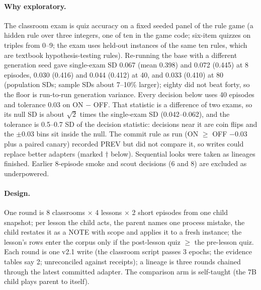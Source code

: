 \documentclass{article}
\begin{document}
\paragraph{Why exploratory.} The classroom exam is quiz accuracy on a fixed seeded panel of the rule game (a hidden rule over three integers, one of ten in the game code; six-item quizzes on triples from 0--9; the exam uses held-out instances of the same ten rules, which are textbook hypothesis-testing rules). Re-running the base with a different generation seed gave single-exam SD 0.067 (mean 0.398) and 0.072 (0.445) at 8 episodes, 0.030 (0.416) and 0.044 (0.412) at 40, and 0.033 (0.410) at 80 (population SDs; sample SDs about 7--10\% larger); eighty did not beat forty, so the floor is run-to-run generation variance. Every decision below uses 40 episodes and tolerance 0.03 on ON $-$ OFF. That statistic is a difference of two exams, so its null SD is about $\sqrt{2}$ times the single-exam SD (0.042--0.062), and the tolerance is 0.5--0.7 SD of the decision statistic: decisions near it are coin flips and the $\pm 0.03$ bins sit inside the null. The commit rule as run (ON $\ge$ OFF $-0.03$ plus a paired canary) recorded PREV but did not compare it, so writes could replace better adapters (marked $\dagger$ below). Sequential looks were taken as lineages finished. Earlier 8-episode smoke and scout decisions (6 and 8) are excluded as underpowered.

\paragraph{Design.} One round is 8 classrooms $\times$ 4 lessons $\times$ 2 short episodes from one child snapshot; per lesson the child acts, the parent names one process mistake, the child restates it as a NOTE with scope and applies it to a fresh instance; the lesson's rows enter the corpus only if the post-lesson quiz $\ge$ the pre-lesson quiz. Each round is one v2.1 write (the classroom script passes 3 epochs; the evidence tables say 2; unreconciled against receipts); a lineage is three rounds chained through the latest committed adapter. The comparison arm is self-taught (the 7B child plays parent to itself).
\end{document}
